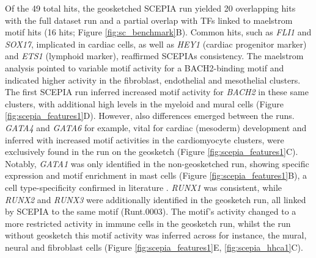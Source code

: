 Of the 49 total hits, the geosketched SCEPIA run yielded 20 overlapping hits with the full dataset run and a partial overlap with TFs linked to maelstrom motif hits (16 hits; Figure \ref{fig:sc_benchmark}B). Common hits, such as \textit{FLI1} and \textit{SOX17}, implicated in cardiac cells, as well as \textit{HEY1} (cardiac progenitor marker) and \textit{ETS1} (lymphoid marker), reaffirmed SCEPIAs consistency. The maelstrom analysis pointed to variable motif activity for a BACH2-binding motif and indicated higher activity in the fibroblast, endothelial and mesothelial clusters. The first SCEPIA run inferred increased motif activity for \textit{BACH2} in these same clusters, with additional high levels in the myeloid and mural cells (Figure \ref{fig:scepia_features1}D). However, also differences emerged between the runs. \textit{GATA4} and \textit{GATA6} for example, vital for cardiac (mesoderm) development and inferred with increased motif activities in the cardiomyocyte clusters, were exclusively found in the run on the geosketch (Figure \ref{fig:scepia_features1}C\cite{Morrisey1996,Song2022}). Notably, \textit{GATA1} was only identified in the non-geosketched run, showing specific expression and motif enrichment in mast cells (Figure \ref{fig:scepia_features1}B), a cell type-specificity confirmed in literature  \cite{Migliaccio2003,Gao2015}. \textit{RUNX1} was consistent, while \textit{RUNX2} and \textit{RUNX3} were additionally identified in the geosketch run, all linked by SCEPIA to the same motif (Runt.0003). The motif's activity changed to a more restricted activity in immune cells in the geosketch run, whilst the run without geosketch this motif activity was inferred across for instance, the mural, neural and fibroblast cells (Figure \ref{fig:scepia_features1}E, \ref{fig:scepia_hhca1}C).

